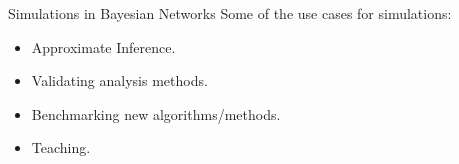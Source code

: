 \documentclass{beamer}
\begin{document}

\begin{frame}{Simulations in Bayesian Networks}
	Some of the use cases for simulations:
	\begin{itemize}
		\item Approximate Inference.
		\item Validating analysis methods.
		\item Benchmarking new algorithms/methods.
		\item Teaching.
	\end{itemize}
\end{frame}
\end{document}
